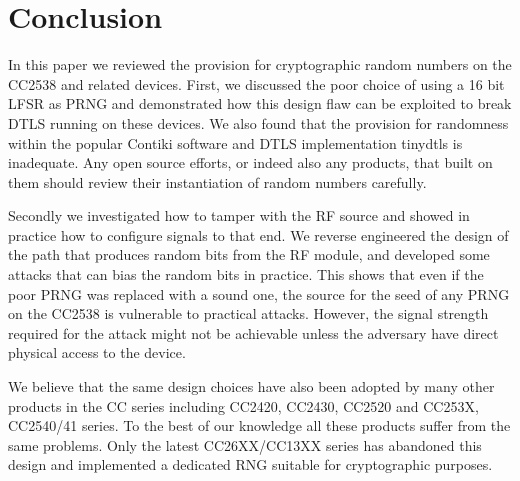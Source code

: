 \section{Conclusion}\label{Conclusion}
In this paper we reviewed the provision for cryptographic random numbers on the CC2538 and related devices. First, we discussed the poor choice of using a 16 bit LFSR as PRNG  and demonstrated how this design flaw can be exploited to break DTLS running on these devices. We also found that the provision for randomness within the popular Contiki software and DTLS implementation tinydtls is inadequate. Any open source efforts, or indeed also any products, that built on them should review their instantiation of random numbers carefully. 

Secondly we investigated how to tamper with the RF source and showed in practice how to configure signals to that end. We reverse engineered the design of the path that produces random bits from the RF module, and developed some attacks that can bias the random bits in practice. This shows that even if the poor PRNG was replaced with a sound one, the source for the seed of any PRNG on the CC2538 is vulnerable to practical attacks. However, the signal strength required for the attack might not be achievable unless the adversary have direct physical access to the device.

We believe that the same design choices have also been adopted by many other products in the CC series including CC2420\cite{CC2420Manual}, CC2430\cite{CC2430Manual}, CC2520\cite{CC2520Manual} and CC253X, CC2540/41 series\cite{CC2530Manual}. To the best of our knowledge all these products suffer from the same problems. Only the latest CC26XX/CC13XX\cite{CC26XXManual} series has abandoned this design and implemented a dedicated RNG suitable for cryptographic purposes.




